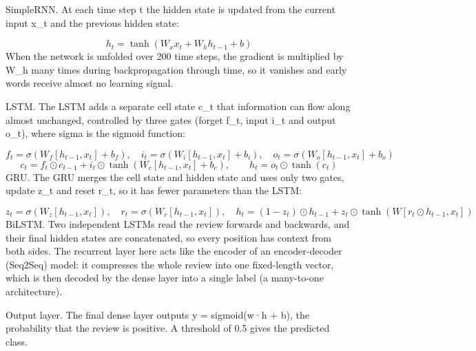 \documentclass[12pt,a4paper,oneside]{report}
\begin{document}
SimpleRNN. At each time step t the hidden state is updated from the current input x\_t and the previous hidden state:

\begin{equation*}h_t = \tanh(W_x x_t + W_h h_{t-1} + b)\end{equation*}
When the network is unfolded over 200 time steps, the gradient is multiplied by W\_h many times during backpropagation through time, so it vanishes and early words receive almost no learning signal.

LSTM. The LSTM adds a separate cell state c\_t that information can flow along almost unchanged, controlled by three gates (forget f\_t, input i\_t and output o\_t), where sigma is the sigmoid function:

\begin{equation*}f_t = \sigma(W_f[h_{t-1},x_t]+b_f),\quad i_t = \sigma(W_i[h_{t-1},x_t]+b_i),\quad o_t = \sigma(W_o[h_{t-1},x_t]+b_o)\end{equation*}
\begin{equation*}c_t = f_t \odot c_{t-1} + i_t \odot \tanh(W_c[h_{t-1},x_t]+b_c),\qquad h_t = o_t \odot \tanh(c_t)\end{equation*}
GRU. The GRU merges the cell state and hidden state and uses only two gates, update z\_t and reset r\_t, so it has fewer parameters than the LSTM:

\begin{equation*}z_t = \sigma(W_z[h_{t-1},x_t]),\quad r_t = \sigma(W_r[h_{t-1},x_t]),\quad h_t = (1-z_t)\odot h_{t-1} + z_t \odot \tanh(W[r_t \odot h_{t-1}, x_t])\end{equation*}
BiLSTM. Two independent LSTMs read the review forwards and backwards, and their final hidden states are concatenated, so every position has context from both sides. The recurrent layer here acts like the encoder of an encoder-decoder (Seq2Seq) model: it compresses the whole review into one fixed-length vector, which is then decoded by the dense layer into a single label (a many-to-one architecture).

Output layer. The final dense layer outputs y = sigmoid(w·h + b), the probability that the review is positive. A threshold of 0.5 gives the predicted class.
\end{document}
